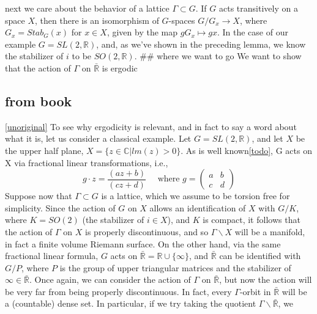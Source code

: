 \documentclass[
]{article}
\theoremstyle{break}
\theoremstyle{plain}
\begin{document}
next we care about the behavior of a lattice $\Gamma \subset G$. If
$G$ acts transitively on a space $X$, then there is an isomorphism
of $G$-spaces $G/G_x \rightarrow X$, where $G_x = Stab_G (x)$ for
$x \in X$, given by the map $gG_x \mapsto gx$. In the case of our
example $G = SL(2, \mathbb{R})$, and, as we've shown in the preceding
lemma, we know the stabilizer of $i$ to be $SO(2,\mathbb{R})$. \#\#
where we want to go We want to show that the action of $\Gamma$ on
$\bar{\mathbb{R}}$ is ergodic

\hypertarget{from-book}{%
\subsection{from book}\label{from-book}}

\href{Zimmer\%20p.4}{{[}unoriginal{]}} To see why ergodicity is
relevant, and in fact to say a word about what it is, let us consider a
classical example. Let $G = SL(2, \mathbb{R})$, and let $X$ be the
upper half plane, $X= \{z \in \mathbb{C} | lm(z) > 0\}$. As is well
known\href{upper\%20half\%20plane,\%20möbius\%20transforms,\%20give\%20reference\%20to\%20misc\%20things.\%20and\%20figure\%20out\%20what\%20the\%20actual\%20example\%20is.\%20figure\%20out\%20what\%20the\%20theorem\%20tries\%20to\%20answer.}{{[}todo{]}},
G acts on X via fractional linear transformations, i.e., \[
g \cdot z=\frac{(az+b)}{(cz+d)}
\quad
\text{ where }g=
\begin{pmatrix}a & b \\ c & d\end{pmatrix}
\] Suppose now that $\Gamma \subset G$ is a lattice, which we assume
to be torsion free for simplicity. Since the action of $G$ on $X$
allows an identification of $X$ with $G/K$, where $K = SO(2)$ (the
stabilizer of $i \in X$), and $K$ is compact, it follows that the
action of $\Gamma$ on $X$ is properly discontinuous, and so
$\Gamma\backslash X$ will be a manifold, in fact a finite volume
Riemann surface. On the other hand, via the same fractional linear
formula, $G$ acts on
$\bar{\mathbb{R}} = \mathbb{R} \cup \{ \infty \}$, and
$\bar{\mathbb{R}}$ can be identified with $G/P$, where $P$ is the
group of upper triangular matrices and the stabilizer of
$\infty \in \bar{\mathbb{R}}$. Once again, we can consider the action
of $\Gamma$ on $\bar{\mathbb{R}}$, but now the action will be very
far from being properly discontinuous. In fact, every $\Gamma$-orbit
in $\bar{\mathbb{R}}$ will be a (countable) dense set. In particular,
if we try taking the quotient $\Gamma\backslash\bar{\mathbb{R}}$, we
\end{document}

